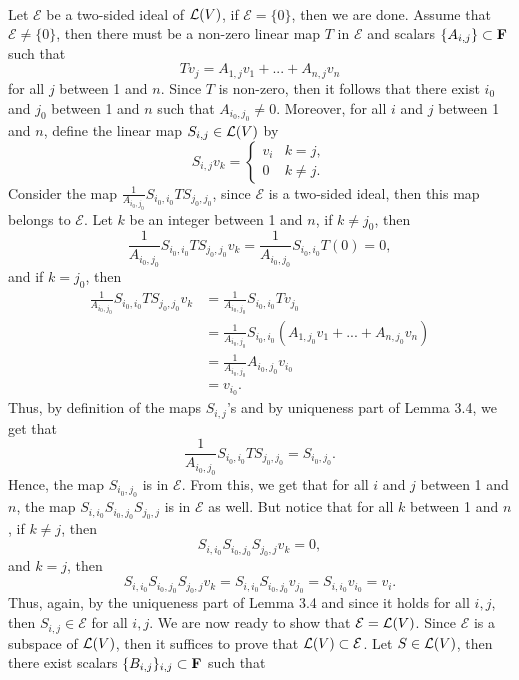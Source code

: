 \begin{solution}
    \\ Let $\mathcal{E}$ be a two-sided ideal of $\mathcal{L}(V)$, if $\mathcal{E} = \{0\}$, then we are done. Assume that $\mathcal{E} \neq \{0\}$, then there must be a non-zero linear map $T$ in $\mathcal{E}$ and scalars $\{A_{i,j}\} \subset \mathbf{F}$ such that 
    $$T v_j = A_{1,j}v_1 + ... + A_{n,j}v_n$$
    for all $j$ between 1 and $n$. Since $T$ is non-zero, then it follows that there exist $i_0$ and $j_0$ between 1 and $n$ such that $A_{i_0, j_0} \neq 0$. Moreover, for all $i$ and $j$ between 1 and $n$, define the linear map $S_{i,j} \in \mathcal{L}(V)$ by
    $$S_{i,j} v_k = \begin{cases} v_i & k = j, \\ 0 & k \neq j. \end{cases}$$
    Consider the map $\frac{1}{A_{i_0,j_0}}S_{i_0,i_0}T S_{j_0, j_0}$, since $\mathcal{E}$ is a two-sided ideal, then this map belongs to $\mathcal{E}$. Let $k$ be an integer between 1 and $n$, if $k \neq j_0$, then
    $$\frac{1}{A_{i_0,j_0}}S_{i_0,i_0}T S_{j_0, j_0} v_k = \frac{1}{A_{i_0,j_0}}S_{i_0,i_0}T(0) = 0,$$ 
    and if $k = j_0$, then 
    \begin{align*}
        \frac{1}{A_{i_0,j_0}}S_{i_0,i_0}T S_{j_0, j_0} v_k &= \frac{1}{A_{i_0,j_0}}S_{i_0,i_0}Tv_{j_0} \\
        &= \frac{1}{A_{i_0,j_0}}S_{i_0,i_0}(A_{1,j_0}v_1 + ... + A_{n,j_0}v_n)\\
        &= \frac{1}{A_{i_0,j_0}}A_{i_0, j_0}v_{i_0}\\
        &= v_{i_0}.
    \end{align*}
    Thus, by definition of the maps $S_{i,j}$'s and by uniqueness part of Lemma 3.4, we get that
    $$\frac{1}{A_{i_0,j_0}}S_{i_0,i_0}T S_{j_0, j_0} = S_{i_0, j_0}.$$
    Hence, the map $S_{i_0, j_0}$ is in $\mathcal{E}$. From this, we get that for all $i$ and $j$ between 1 and $n$, the map $S_{i,i_0}S_{i_0, j_0} S_{j_0, j}$ is in $\mathcal{E}$ as well. But notice that for all $k$ between 1 and $n$, if $k \neq j$, then
    $$S_{i,i_0}S_{i_0, j_0} S_{j_0, j} v_k = 0,$$
    and $k = j$, then 
    $$S_{i,i_0}S_{i_0, j_0} S_{j_0, j} v_k = S_{i,i_0}S_{i_0, j_0} v_{j_0} = S_{i,i_0}v_{i_0} = v_i.$$
    Thus, again, by the uniqueness part of Lemma 3.4 and since it holds for all $i,j$, then $S_{i,j} \in \mathcal{E}$ for all $i,j$. We are now ready to show that $\mathcal{E} = \mathcal{L}(V)$. Since $\mathcal{E}$ is a subspace of $\mathcal{L}(V)$, then it suffices to prove that $\mathcal{L}(V) \subset \mathcal{E}$. Let $S \in \mathcal{L}(V)$, then there exist scalars $\{B_{i,j}\}_{i,j} \subset \mathbf{F}$ such that

\end{solution}
